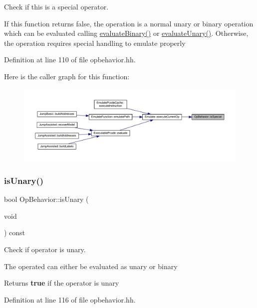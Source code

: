 Check if this is a special operator. 

If this function returns false, the operation is a normal unary or binary operation which can be evaluated calling \mbox{\hyperlink{class_op_behavior_aeeed3af7aa35264b31a1f182884214a9}{evaluate\+Binary()}} or \mbox{\hyperlink{class_op_behavior_acd4f5a1c0dee0414f3c541620b88fe45}{evaluate\+Unary()}}. Otherwise, the operation requires special handling to emulate properly 

Definition at line 110 of file opbehavior.\+hh.

Here is the caller graph for this function\+:
\nopagebreak
\begin{figure}[H]
\begin{center}
\leavevmode
\includegraphics[width=350pt]{class_op_behavior_ae7d553131d5eff60ff3e2f15c072a8af_icgraph}
\end{center}
\end{figure}
\mbox{\label{class_op_behavior_a44a9dd4be5e4a4ccde3be993dc308033}} 
\subsubsection{\texorpdfstring{isUnary()}{isUnary()}}
{\footnotesize\ttfamily bool Op\+Behavior\+::is\+Unary (\begin{DoxyParamCaption}\item[{void}]{ }\end{DoxyParamCaption}) const\hspace{0.3cm}{\ttfamily [inline]}}



Check if operator is unary. 

The operated can either be evaluated as unary or binary \begin{DoxyReturn}{Returns}
{\bfseries{true}} if the operator is unary 
\end{DoxyReturn}


Definition at line 116 of file opbehavior.\+hh.

